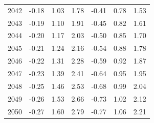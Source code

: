\begin{table}
\begin{tabular}{lrrrrrr}
2042 & -0.18 & 1.03 & 1.78 & -0.41 & 0.78 & 1.53 \\
2043 & -0.19 & 1.10 & 1.91 & -0.45 & 0.82 & 1.61 \\
2044 & -0.20 & 1.17 & 2.03 & -0.50 & 0.85 & 1.70 \\
2045 & -0.21 & 1.24 & 2.16 & -0.54 & 0.88 & 1.78 \\
2046 & -0.22 & 1.31 & 2.28 & -0.59 & 0.92 & 1.87 \\
2047 & -0.23 & 1.39 & 2.41 & -0.64 & 0.95 & 1.95 \\
2048 & -0.25 & 1.46 & 2.53 & -0.68 & 0.99 & 2.04 \\
2049 & -0.26 & 1.53 & 2.66 & -0.73 & 1.02 & 2.12 \\
2050 & -0.27 & 1.60 & 2.79 & -0.77 & 1.06 & 2.21 \\
\bottomrule
\end{tabular}
\end{table}
